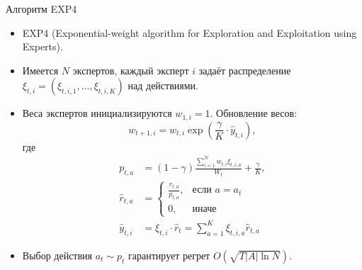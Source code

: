 \documentclass[10pt]{beamer}
\begin{document}
\begin{frame}{Алгоритм EXP4}
  \begin{itemize}
    \item EXP4 (Exponential-weight algorithm for Exploration and Exploitation using Experts).
    \item Имеется $N$ экспертов, каждый эксперт $i$ задаёт распределение $\xi_{t,i} = (\xi_{t,i,1}, ..., \xi_{t,i,K})$ над действиями.
    \item Веса экспертов инициализируются $w_{1,i} = 1$. Обновление весов:
    \[
    w_{t+1,i} = w_{t,i} \exp\left(\frac{\gamma}{K} \cdot \hat{y}_{t,i}\right),
    \]
    где 
    \begin{align*}
    p_{t,a} &= (1-\gamma)\frac{\sum_{i=1}^N w_{t,i}\xi_{t,i,a}}{W_t} + \frac{\gamma}{K}, \\
    \hat{r}_{t,a} &= \begin{cases}
    \frac{r_{t,a}}{p_{t,a}}, & \text{если } a = a_t \\
    0, & \text{иначе}
    \end{cases} \\
    \hat{y}_{t,i} &= \xi_{t,i} \cdot \hat{r}_t = \sum_{a=1}^K \xi_{t,i,a}\hat{r}_{t,a}
    \end{align*}
    \item Выбор действия $a_t\sim p_t$ гарантирует регрет $O(\sqrt{T|A|\ln N})$.
  \end{itemize}
\end{frame}
\end{document}
